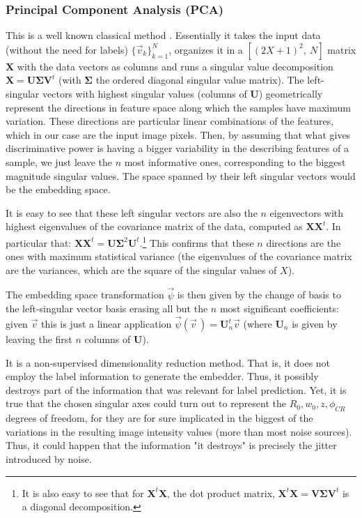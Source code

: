 \documentclass[11pt, a4paper, twoside]{article} %
\DeclareRobustCommand{\mybox}[2][gray!10]{%
\begin{tcolorbox}[   %
        left=0.2cm,
        right=0.2cm,
        top=0.15cm,
        bottom=0.15cm,
        colback=#1,
        colframe=#1,
        width=\dimexpr\textwidth\relax, 
        enlarge left by=0mm,
        boxsep=5pt,
        arc=0pt,outer arc=0pt,
        ]
        #2
\end{tcolorbox}
}
\begin{document}
\subsubsection*{Principal Component Analysis (PCA)\vspace{-0.2cm}}
This is a well known classical method  \cite{PCA}. Essentially it takes the input data (without the need for labels) $\{\vec{v}_k\}_{k=1}^N$, organizes it in a $[(2X+1)^2,\ N]$ matrix $\pmb{X}$ with the data vectors as columns and runs a singular value decomposition $\pmb{X}=\pmb{U}\pmb{\Sigma}\pmb{V}^t$ (with $\pmb{\Sigma}$ the ordered diagonal singular value matrix). The left-singular vectors with highest singular values (columns of $\pmb{U}$) geometrically represent the directions in feature space along which the samples have maximum variation. These directions are particular linear combinations of the features, which in our case are the input image pixels. Then, by assuming that what gives discriminative power is having a bigger variability in the describing features of a sample, we just leave the $n$ most informative ones, corresponding to the biggest magnitude singular values. The space spanned by their left singular vectors would be the embedding space. 
\mybox{
It is easy to see that these left singular vectors are also the $n$ eigenvectors with highest eigenvalues of the covariance matrix of the data, computed as $\pmb{X}\pmb{X}^t$. In particular that: $\pmb{X}\pmb{X}^t=\pmb{U}\pmb{\Sigma}^2\pmb{U}^t$.\footnote{It is also easy to see that for $\pmb{X}^t\pmb{X}$, the dot product matrix, $\pmb{X}^t\pmb{X}=\pmb{V}\pmb{\Sigma}\pmb{V}^t$ is a diagonal decomposition.} This confirms that these $n$ directions are the ones with maximum statistical variance (the eigenvalues of the covariance matrix are the variances, which are the square of the singular values of $X$).%
}
\mybox{
The embedding space transformation $\vec{\psi}$ is then given by the change of basis to the left-singular vector basis erasing all but the $n$ most significant coefficients: given $\vec{v}$ this is just a linear application $\vec{\psi}(\vec{v}\,)=\pmb{U}_{n}^t\vec{v}$ (where $\pmb{U}_{n}$ is given by leaving the first $n$ columns of $\pmb{U}$). \vspace{-0.13cm}
}\vspace{-0.15cm}

It is a non-supervised dimensionality reduction method. That is, it does not employ the label information to generate the embedder. Thus, it possibly destroys part of the information that was relevant for label prediction. Yet, it is true that the chosen singular axes could turn out to represent the $R_0,w_0,z,\phi_{CR}$ degrees of freedom, for they are for sure implicated in the biggest of the variations in the resulting image intensity values (more than most noise sources). Thus, it could happen that the information "it destroys" is precisely the jitter introduced by noise.
\end{document}
